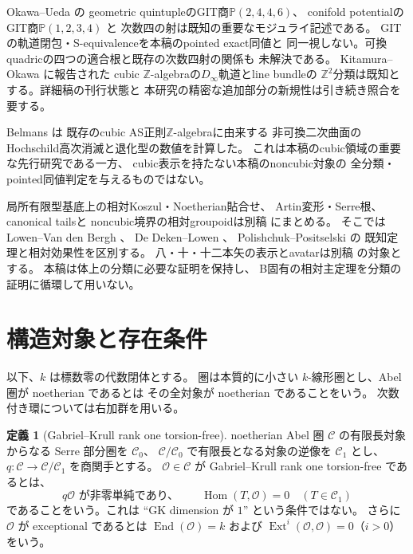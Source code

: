 \documentclass[a4paper,11pt]{ltjsarticle}
\numberwithin{equation}{section}
\theoremstyle{plain}
\theoremstyle{definition}
\newtheorem{definition}[theorem]{定義}
\theoremstyle{remark}
\newcommand{\OO}{\mathcal O}
\newcommand{\cC}{\mathcal C}
\newcommand{\PP}{\mathbb P}
\DeclareMathOperator{\Hom}{Hom}
\DeclareMathOperator{\End}{End}
\DeclareMathOperator{\Ext}{Ext}
\begin{document}
Okawa--Ueda \cite[Theorem 1.1]{OU2014} の
geometric quintupleのGIT商$\PP(2,4,4,6)$、
conifold potentialのGIT商$\PP(1,2,3,4)$ と
次数四の射は既知の重要なモジュライ記述である。
GITの軌道閉包・S-equivalenceを本稿のpointed exact同値と
同一視しない。可換quadricの四つの適合根と既存の次数四射の関係も
未解決である。
Kitamura--Okawa \cite{OkawaKitamura2022OWR} に報告された
cubic $\mathbb Z$-algebraの$D_\infty$軌道とline bundleの
$\mathbb Z^2$分類は既知とする。詳細稿の刊行状態と
本研究の精密な追加部分の新規性は引き続き照合を要する。

Belmans \cite[Proposition 31, Corollary 32, Table 2]{Belmans2019} は
既存のcubic AS正則$\mathbb Z$-algebraに由来する
非可換二次曲面のHochschild高次消滅と退化型の数値を計算した。
これは本稿のcubic領域の重要な先行研究である一方、
cubic表示を持たない本稿のnoncubic対象の
全分類・pointed同値判定を与えるものではない。

局所有限型基底上の相対Koszul・Noetherian貼合せ、
Artin変形・Serre根、canonical tailsと
noncubic境界の相対groupoidは別稿
\cite{QuadricModuli2026} にまとめる。
そこではLowen--Van den Bergh \cite{LowenVanDenBergh2006}、
De Deken--Lowen \cite{DeDekenLowen2011}、
Polishchuk--Positselski \cite{PolishchukPositselski2005}の
既知定理と相対効果性を区別する。
八・十・十二本矢の表示とavatarは別稿
\cite{QuiverAvatarModuli2026} の対象とする。
本稿は体上の分類に必要な証明を保持し、
B固有の相対主定理を分類の証明に循環して用いない。

\section{構造対象と存在条件}
\label{sec:definition}

以下、$k$ は標数零の代数閉体とする。
圏は本質的に小さい $k$-線形圏とし、Abel 圏が noetherian であるとは
その全対象が noetherian であることをいう。
次数付き環については右加群を用いる。

\begin{definition}[Gabriel--Krull rank one torsion-free]
\label{def:gk-rank}
noetherian Abel 圏 $\cC$ の有限長対象からなる Serre 部分圏を $\cC_0$、
$\cC/\cC_0$ で有限長となる対象の逆像を $\cC_1$ とし、
$q:\cC\to\cC/\cC_1$ を商関手とする。
$\OO\in\cC$ が Gabriel--Krull rank one torsion-free であるとは、
\[
 q\OO\text{ が非零単純であり、}\qquad
 \Hom(T,\OO)=0\quad(T\in\cC_1)
\]
であることをいう。これは ``GK dimension が $1$'' という条件ではない。
さらに $\OO$ が exceptional であるとは
$\End(\OO)=k$ および $\Ext^i(\OO,\OO)=0$（$i>0$）をいう。
\end{definition}
\end{document}
